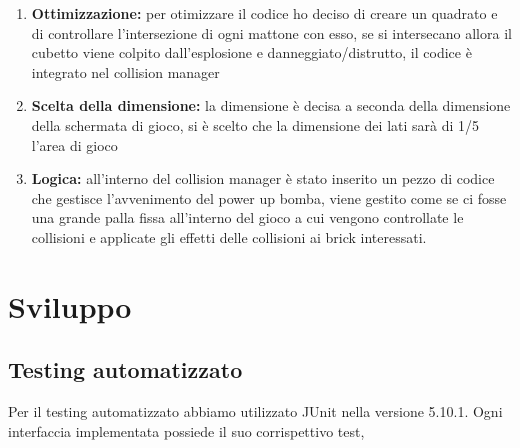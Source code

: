 \documentclass[a4paper,12pt]{report}
\begin{document}
\begin{enumerate}
\item \textbf{Ottimizzazione:} per otimizzare il codice ho deciso di creare un quadrato e di controllare l'intersezione di ogni mattone con esso, se si intersecano allora il cubetto viene colpito dall'esplosione e danneggiato/distrutto, il codice è integrato nel collision manager
\newline
\item \textbf{Scelta della dimensione:} la dimensione è decisa a seconda della dimensione della schermata di gioco, si è scelto che la dimensione dei lati sarà di 1/5 l'area di gioco
\item \textbf{Logica:} all'interno del collision manager è stato inserito un pezzo di codice che gestisce l'avvenimento del power up bomba, viene gestito come se ci fosse una grande palla fissa all'interno del gioco a cui vengono controllate le collisioni e applicate gli effetti delle collisioni ai brick interessati.
\end{enumerate}
\chapter{Sviluppo}
\section{Testing automatizzato}
Per il testing automatizzato abbiamo utilizzato JUnit nella versione 5.10.1.\newline
Ogni interfaccia implementata possiede il suo corrispettivo test,
\end{document}
